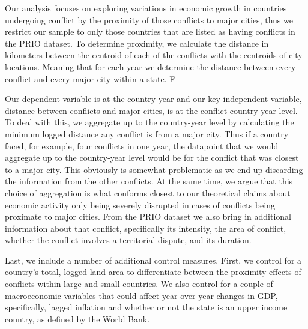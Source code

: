 Our analysis focuses on exploring variations in economic growth in countries undergoing conflict by the proximity of those conflicts to major cities, thus we restrict our sample to only those countries that are listed as having conflicts in the PRIO dataset. To determine proximity, we calculate the distance in kilometers between the centroid of each of the conflicts with the centroids of city locations. Meaning that for each year we determine the distance between every conflict and every major city within a state. F


Our dependent variable is at the country-year and our key independent variable, distance between conflicts and major cities, is at the conflict-country-year level. To deal with this, we aggregate up to the country-year level by calculating the minimum logged distance any conflict is from a major city. Thus if a country faced, for example, four conflicts in one year, the datapoint that we would aggregate up to the country-year level would be for the conflict that was closest to a major city. This obviously is somewhat problematic as we end up discarding the information from the other conflicts. At the same time, we argue that this choice of aggregation is what conforms closest to our theoretical claims about economic activity only being severely disrupted in cases of conflicts being proximate to major cities. From the PRIO dataset we also bring in additional information about that conflict, specifically its intensity, the area of conflict, whether the conflict involves a territorial dispute, and its duration.

Last, we include a number of additional control measures. First, we control for a country's total, logged land area to differentiate between the proximity effects of conflicts within large and small countries. We also control for a couple of macroeconomic variables that could affect year over year changes in GDP, specifically, lagged inflation and whether or not the state is an upper income country, as defined by the World Bank.

